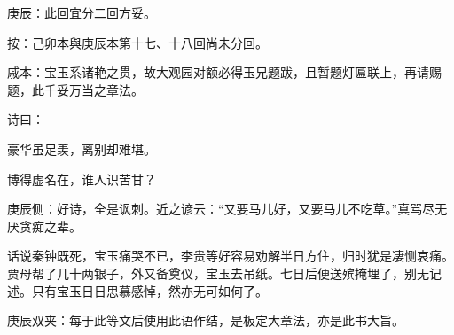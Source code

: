 
\begin{parag}
    \begin{note}庚辰：此回宜分二回方妥。\end{note}\begin{subnote}按：己卯本與庚辰本第十七、十八回尚未分回。\end{subnote}
\end{parag}


\begin{parag}
    \begin{note}戚本：宝玉系诸艳之贯，故大观园对额必得玉兄题跋，且暂题灯匾联上，再请赐题，此千妥万当之章法。\end{note}
\end{parag}


\begin{parag}
    诗曰：
\end{parag}

\begin{poem}
    \begin{pl}豪华虽足羡，离别却难堪。\end{pl}

    \begin{pl}博得虚名在，谁人识苦甘？\end{pl}
    \begin{note}庚辰侧：好诗，全是讽刺。近之谚云：“又要马儿好，又要马儿不吃草。”真骂尽无厌贪痴之辈。\end{note}
\end{poem}


\begin{parag}
    话说秦钟既死，宝玉痛哭不已，李贵等好容易劝解半日方住，归时犹是凄恻哀痛。贾母帮了几十两银子，外又备奠仪，宝玉去吊纸。七日后便送殡掩埋了，别无记述。只有宝玉日日思慕感悼，然亦无可如何了。\begin{note}庚辰双夹：每于此等文后使用此语作结，是板定大章法，亦是此书大旨。\end{note}
\end{parag}


